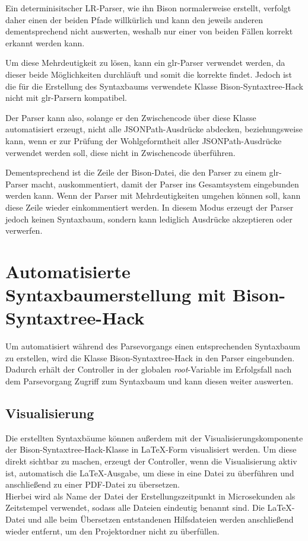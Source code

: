 \documentclass[oneside]{ausarbeitung}
\begin{document}
Ein determinisitscher LR-Parser, wie ihn Bison normalerweise erstellt, verfolgt daher einen der beiden Pfade willkürlich und kann den jeweils anderen dementsprechend nicht auswerten, weshalb nur einer von beiden Fällen korrekt erkannt werden kann. 

Um diese Mehrdeutigkeit zu lösen, kann ein \ac{glr}-Parser verwendet werden, da dieser beide Möglichkeiten durchläuft und somit die korrekte findet. Jedoch ist die für die Erstellung des Syntaxbaums verwendete Klasse Bison-Syntaxtree-Hack nicht mit \ac{glr}-Parsern kompatibel.

Der Parser kann also, solange er den Zwischencode über diese Klasse automatisiert erzeugt, nicht alle JSONPath-Ausdrücke abdecken, beziehungsweise kann, wenn er zur Prüfung der Wohlgeformtheit aller JSONPath-Ausdrücke verwendet werden soll, diese nicht in Zwischencode überführen.

Dementsprechend ist die Zeile der Bison-Datei, die den Parser zu einem \ac{glr}-Parser macht, auskommentiert, damit der Parser ins Gesamtsystem eingebunden werden kann. Wenn der Parser mit Mehrdeutigkeiten umgehen können soll, kann diese Zeile wieder einkommentiert werden. In diesem Modus erzeugt der Parser jedoch keinen Syntaxbaum, sondern kann lediglich Ausdrücke akzeptieren oder verwerfen.


\pagebreak

\section{Automatisierte Syntaxbaumerstellung mit Bison-Syntaxtree-Hack}

Um automatisiert während des Parsevorgangs einen entsprechenden Syntaxbaum zu erstellen, wird die Klasse Bison-Syntaxtree-Hack in den Parser eingebunden. Dadurch erhält der Controller in der globalen \textit{root}-Variable im Erfolgsfall nach dem Parsevorgang Zugriff zum Syntaxbaum und kann diesen weiter auswerten.


\subsection{Visualisierung}

Die erstellten Syntaxbäume können außerdem mit der Visualisierungskomponente der Bison-Syntaxtree-Hack-Klasse in LaTeX-Form visualisiert werden. Um diese direkt sichtbar zu machen, erzeugt der Controller, wenn die Visualisierung aktiv ist, automatisch die LaTeX-Ausgabe, um diese in eine Datei zu überführen und anschließend zu einer PDF-Datei zu übersetzen. \\
Hierbei wird als Name der Datei der Erstellungszeitpunkt in Microsekunden als Zeitstempel verwendet, sodass alle Dateien eindeutig benannt sind. Die LaTeX-Datei und alle beim Übersetzen entstandenen Hilfsdateien werden anschließend wieder entfernt, um den Projektordner nicht zu überfüllen.
\end{document}
